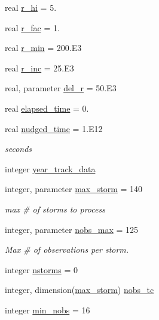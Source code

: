 \begin{DoxyCompactItemize}
\item 
real \hyperlink{classfv__nwp__nudge__mod_a333405a63e3356a6a4f7798929dec480}{r\-\_\-hi} = 5.
\item 
real \hyperlink{classfv__nwp__nudge__mod_ae40e38918bb6ff86846b98d42bfc9c15}{r\-\_\-fac} = 1.
\item 
real \hyperlink{classfv__nwp__nudge__mod_aa3bb326deaf67f4dff2228ac0abba2c8}{r\-\_\-min} = 200.E3
\item 
real \hyperlink{classfv__nwp__nudge__mod_a73e8b9cff0944e7d9517c41fb7fed00f}{r\-\_\-inc} = 25.E3
\item 
real, parameter \hyperlink{classfv__nwp__nudge__mod_a9654eb64171c69405fda2430057e59a5}{del\-\_\-r} = 50.E3
\item 
real \hyperlink{classfv__nwp__nudge__mod_a80705a18203ac9f1ade4dfaf5396ed19}{elapsed\-\_\-time} = 0.
\item 
real \hyperlink{classfv__nwp__nudge__mod_a25110c10c670ba1da3b3897a09b2098e}{nudged\-\_\-time} = 1.E12
\begin{DoxyCompactList}\small\item\em seconds \end{DoxyCompactList}\item 
integer \hyperlink{classfv__nwp__nudge__mod_a9171eb4f9d03ed8a5648ba241620df1c}{year\-\_\-track\-\_\-data}
\item 
integer, parameter \hyperlink{classfv__nwp__nudge__mod_aac3d8d546e1954263ae52400f44d2c7c}{max\-\_\-storm} = 140
\begin{DoxyCompactList}\small\item\em max \# of storms to process \end{DoxyCompactList}\item 
integer, parameter \hyperlink{classfv__nwp__nudge__mod_ac3d3a0cbdfff5f6ed3757fcc2b70309d}{nobs\-\_\-max} = 125
\begin{DoxyCompactList}\small\item\em Max \# of observations per storm. \end{DoxyCompactList}\item 
integer \hyperlink{classfv__nwp__nudge__mod_a9c3ad6de2a20927fcd7f0b6433599038}{nstorms} = 0
\item 
integer, dimension(\hyperlink{classfv__nwp__nudge__mod_aac3d8d546e1954263ae52400f44d2c7c}{max\-\_\-storm}) \hyperlink{classfv__nwp__nudge__mod_a5c2925d3d3fb1e24385718a9533b8092}{nobs\-\_\-tc}
\item 
integer \hyperlink{classfv__nwp__nudge__mod_a1097a1064cec1b746d3c06aebb722114}{min\-\_\-nobs} = 16

\end{DoxyCompactItemize}
